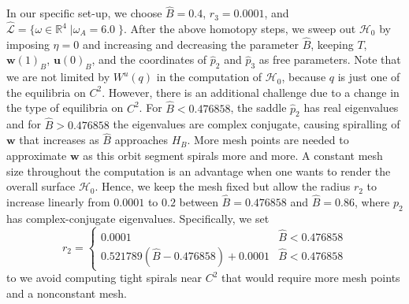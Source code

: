 \documentclass{ws-ijbc}
\begin{document}
In our specific set-up, we choose $\widehat{B}=0.4$, $r_3 = 0.0001$, and $\widehat{\mathscr{L}}=\{ \omega \in \mathbb{R}^4 \; | \omega_A = 6.0\; \}$.  After the above homotopy steps, we sweep out $\mathscr{H}_0$ by imposing $\eta = 0$ and increasing and decreasing the parameter $\widehat{B}$, keeping $T$, $\mathbf{w}(1)_B$, $\mathbf{u}(0)_B$, and the coordinates of $\widehat{p}_2$ and $\widehat{p}_3$ as free parameters.  Note that we are not limited by $W^u(q)$ in the computation of $\mathscr{H}_0$, because $q$ is just one of the equilibria on $C^2$.  However, there is an additional challenge due to a change in the type of equilibria on $C^2$.  For $\widehat{B} < 0.476858$, the saddle $\widehat{p}_2$ has real eigenvalues and for $\widehat{B} > 0.476858$ the eigenvalues are complex conjugate, causing spiralling of $\mathbf{w}$ that increases as $\widehat{B}$ approaches $H_B$.  More mesh points are needed to approximate $\mathbf{w}$ as this orbit segment spirals more and more.  A constant mesh size throughout the computation is an advantage when one wants to render the overall surface $\mathscr{H}_0$. Hence, we keep the mesh fixed but allow the radius $r_2$ to increase linearly from $0.0001$ to $0.2$ between $\widehat{B}=0.476858$ and $\widehat{B}=0.86$, where $p_2$ has complex-conjugate eigenvalues. Specifically, we set 
%
\[r_2= \begin{cases} 
      0.0001 & \widehat {B} < 0.476858 \\
      0.521789(\widehat{B} - 0.476858) + 0.0001 & \widehat {B} < 0.476858
   \end{cases}
\]
%
to we avoid computing tight spirals near $C^2$ that would require more mesh points and a nonconstant mesh.
\end{document}
